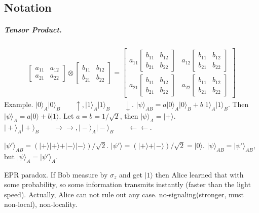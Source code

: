 \documentclass{article}
\begin{document}
\begin{CJK}{UTF8}{gkai}
\begin{spacing}{1.2}
\subsection{Notation}
\subparagraph{Tensor Product.}
\begin{gather*}
\left[\begin{array}{cc} a_{11} & a_{12} \\ a_{21}& a_{22}\end{array}\right] \otimes \left[\begin{array}{cc} b_{11} & b_{12}\\ b_{21}& b_{22} \end{array}\right] =
\left[\begin{array}{cc} a_{11} \left[\begin{array}{cc} b_{11} & b_{12}\\ b_{21}& b_{22} \end{array}\right]  & a_{12} \left[\begin{array}{cc} b_{11} & b_{12}\\ b_{21}& b_{22} \end{array}\right]  \\ a_{21}  \left[\begin{array}{cc} b_{11} & b_{12}\\ b_{21}& b_{22} \end{array}\right]  & a_{22}  \left[\begin{array}{cc} b_{11} & b_{12}\\ b_{21}& b_{22} \end{array}\right] \end{array}\right] 
\end{gather*}
Example. $\vert 0\rangle_A \vert 0\rangle_B\qquad \uparrow, \vert 1\rangle_A \vert 1\rangle_B\qquad \downarrow$. $\vert \psi\rangle_{AB} = a\vert 0\rangle_A \vert 0\rangle_B + b\vert 1\rangle_A \vert 1\rangle_B$. Then $\vert \psi\rangle_A = a\vert 0\rangle + b\vert 1\rangle$. Let $a = b = 1/\sqrt2$, then $\vert\psi\rangle_A = \vert +\rangle$.\\
$\vert+\rangle_A\vert +\rangle_B\qquad \rightarrow\rightarrow, \vert -\rangle_A \vert -\rangle_B\qquad \leftarrow \leftarrow$.

$\vert \psi'\rangle_{AB} = (\vert +\rangle\vert +\rangle + \vert -\rangle \vert -\rangle)/\sqrt{2}$. $\vert\psi'\rangle = (\vert +\rangle + \vert -\rangle)/\sqrt2 = \vert 0\rangle$. 
$\vert \psi\rangle_{AB} = \vert \psi'\rangle_{AB}$, but $\vert \psi\rangle_A = \vert\psi'\rangle_A$.

EPR paradox. If Bob measure by $\sigma_z$ and get $\vert 1\rangle$ then Alice learned that with some probability, so some information transmits instantly (faster than the light speed). Actually, Alice can not rule out any case. no-signaling(stronger, must non-local), non-locality. 


\end{spacing}
\end{CJK}
\end{document}
